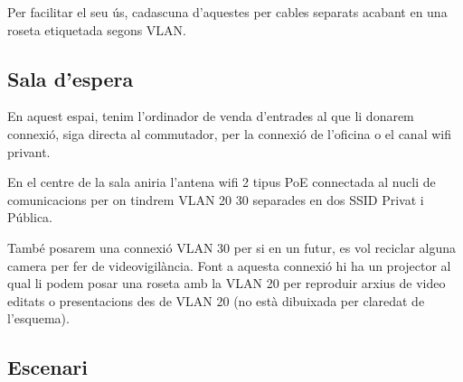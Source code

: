 \documentclass[
  10pt,
]{krantz}
\begin{document}
Per facilitar el seu ús, cadascuna d'aquestes per cables separats acabant en una roseta etiquetada segons VLAN.

\hypertarget{sala-despera}{%
\subsection{Sala d'espera}\label{sala-despera}}

En aquest espai, tenim l'ordinador de venda d'entrades al que li donarem connexió, siga directa al commutador, per la connexió de l'oficina o el canal wifi privant.

En el centre de la sala aniria l'antena wifi 2 tipus PoE connectada al nucli de comunicacions per on tindrem VLAN 20 30 separades en dos SSID Privat i Pública.

També posarem una connexió VLAN 30 per si en un futur, es vol reciclar alguna camera per fer de videovigilància. Font a aquesta connexió hi ha un projector al qual li podem posar una roseta amb la VLAN 20 per reproduir arxius de video editats o presentacions des de VLAN 20 (no està dibuixada per claredat de l'esquema).

\hypertarget{escenari}{%
\subsection{Escenari}\label{escenari}}
\end{document}
